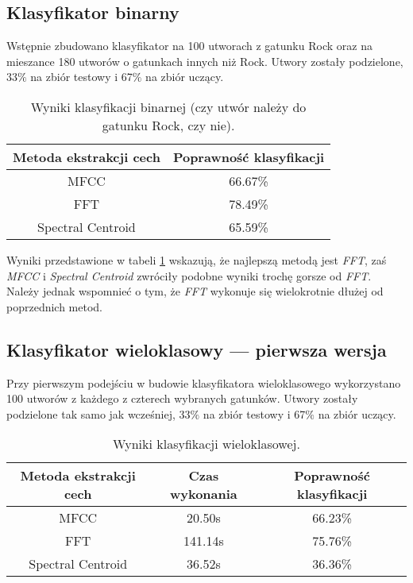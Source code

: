 \documentclass[10pt,a4paper]{article}
\begin{document}
\subsection{Klasyfikator binarny}
Wstępnie zbudowano klasyfikator na 100 utworach z gatunku Rock oraz na mieszance 180 utworów o gatunkach innych niż Rock. Utwory zostały podzielone, 33$\%$ na zbiór testowy i 67$\%$ na zbiór uczący.
\begin{table}[h]
\centering
\caption{Wyniki klasyfikacji binarnej (czy utwór należy do gatunku Rock, czy nie).}
\label{tab:t1}
\begin{tabular}{cc}
\hline
\textbf{Metoda ekstrakcji cech} & \textbf{Poprawność klasyfikacji} \\ \hline
MFCC                            & 66.67\%                          \\
FFT                             & 78.49\%                          \\
Spectral Centroid               & 65.59\%                          \\ \hline
\end{tabular}
\end{table}

Wyniki przedstawione w tabeli \ref{tab:t1} wskazują, że najlepszą metodą jest  \textit{FFT}, zaś \textit{MFCC} i \textit{Spectral Centroid} zwróciły podobne wyniki trochę gorsze od \textit{FFT}. Należy jednak wspomnieć o tym, że \textit{FFT} wykonuje się wielokrotnie dłużej od poprzednich metod.

\subsection{Klasyfikator wieloklasowy --- pierwsza wersja}
Przy pierwszym podejściu w budowie klasyfikatora wieloklasowego wykorzystano 100 utworów z każdego z czterech wybranych gatunków. Utwory zostały podzielone tak samo jak wcześniej, 33$\%$ na zbiór testowy i 67$\%$ na zbiór uczący.
\begin{table}[h]
\centering
\caption{Wyniki klasyfikacji wieloklasowej.}
\label{tab:t2}
\begin{tabular}{ccc}
\hline
\textbf{Metoda ekstrakcji cech} & \textbf{Czas wykonania} & \textbf{Poprawność klasyfikacji} \\ \hline
MFCC                            & 20.50s                  & 66.23\%                          \\
FFT                             & 141.14s                 & 75.76\%                          \\
Spectral Centroid               & 36.52s                  & 36.36\%                          \\ \hline
\end{tabular}
\end{table}
\end{document}
